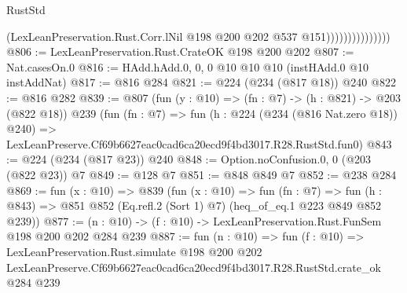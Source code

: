 \begin{lexlean}{RustStd}
\begin{coremodule}
                                (LexLeanPreservation.Rust.Corr.lNil
                                  @198
                                  @200
                                  @202
                                  @537
                                  @151)))))))))))))))
@806 := LexLeanPreservation.Rust.CrateOK @198 @200 @202
@807 := Nat.casesOn.{0}
@816 := HAdd.hAdd.{0, 0, 0} @10 @10 @10 (instHAdd.{0} @10 instAddNat)
@817 := @816 @284
@821 := @224 (@234 (@817 @18)) @240
@822 := @816 @282
@839 := @807
    (fun (y : @10) => (fn : @7) -> (h : @821) -> @203 (@822 @18))
    @239
    (fun (fn : @7) =>
    fun (h : @224 (@234 (@816 Nat.zero @18)) @240) =>
    LexLeanPreserve.Cf69b6627eac0cad6ca20ecd9f4bd3017.R28.RustStd.fun0)
@843 := @224 (@234 (@817 @23)) @240
@848 := Option.noConfusion.{0, 0} (@203 (@822 @23)) @7
@849 := @128 @7
@851 := @848 @849 @7
@852 := @238 @284
@869 := fun (x : @10) =>
  @839
    (fun (x : @10) =>
    fun (fn : @7) =>
    fun (h : @843) => @851 @852 (Eq.refl.{2} (Sort 1) @7) (heq_of_eq.{1} @223 @849 @852 @239))
@877 := (n : @10) -> (f : @10) -> LexLeanPreservation.Rust.FunSem @198 @200 @202 @284 @239
@887 := fun (n : @10) =>
  fun (f : @10) =>
  LexLeanPreservation.Rust.simulate
    @198
    @200
    @202
    LexLeanPreserve.Cf69b6627eac0cad6ca20ecd9f4bd3017.R28.RustStd.crate_ok
    @284
    @239
\end{coremodule}
\end{lexlean}
